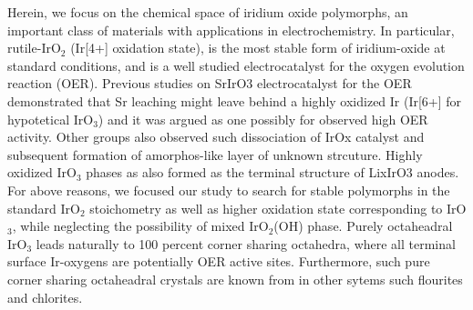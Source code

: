 Herein, we focus on the chemical space of iridium oxide polymorphs,
an important class of materials with applications in electrochemistry.
In particular, rutile-IrO$_2$ (Ir[4+] oxidation state), is the most stable form of iridium-oxide at standard conditions,
and is a well studied electrocatalyst for the oxygen evolution reaction (OER).
\cite{Seitz2016,Lee2012a,McCrory2015,Trotochaud2012,Danilovic2014,Carmo2013,Miles1978,Beni1979}
%
Previous studies on SrIrO3 electrocatalyst for the OER demonstrated that Sr leaching might leave behind a highly oxidized Ir (Ir[6+] for hypotetical IrO$_3$) and it was argued as one possibly for observed high OER activity.\cite{Seitz2016}
Other groups also observed such dissociation of IrOx catalyst and subsequent formation of amorphos-like layer of unknown strcuture. \cite{Pearce2017}
%
Highly oxidized IrO$_3$ phases as also formed as the terminal structure of LixIrO3 anodes.\cite{Pearce2017}
%
For above reasons, we focused our study to search for stable polymorphs in the standard IrO$_2$ stoichometry as well as higher oxidation state corresponding to IrO$_3$,
while neglecting the possibility of mixed IrO$_2$(OH) phase.
%
Purely octaheadral IrO$_3$ leads naturally to 100 percent corner sharing octahedra, where all terminal surface Ir-oxygens are potentially OER active sites.
Furthermore, such pure corner sharing octaheadral crystals are known from in other sytems such flourites and chlorites.





